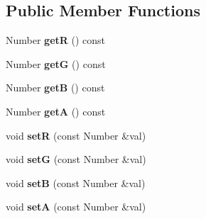 \subsection*{Public Member Functions}
\begin{DoxyCompactItemize}
\item 
\hypertarget{structsambag_1_1com_1_1_color_r_g_b_a_a9b798d27328dbe8bf719c66b1ae38d4b}{
Number {\bfseries getR} () const }
\label{structsambag_1_1com_1_1_color_r_g_b_a_a9b798d27328dbe8bf719c66b1ae38d4b}

\item 
\hypertarget{structsambag_1_1com_1_1_color_r_g_b_a_a1944ccc74667ade7eb8ff3863d9d2be4}{
Number {\bfseries getG} () const }
\label{structsambag_1_1com_1_1_color_r_g_b_a_a1944ccc74667ade7eb8ff3863d9d2be4}

\item 
\hypertarget{structsambag_1_1com_1_1_color_r_g_b_a_af1d0d208eb203a6bea572e62a62da0d8}{
Number {\bfseries getB} () const }
\label{structsambag_1_1com_1_1_color_r_g_b_a_af1d0d208eb203a6bea572e62a62da0d8}

\item 
\hypertarget{structsambag_1_1com_1_1_color_r_g_b_a_a19fb1e72e94790424350f59128c36202}{
Number {\bfseries getA} () const }
\label{structsambag_1_1com_1_1_color_r_g_b_a_a19fb1e72e94790424350f59128c36202}

\item 
\hypertarget{structsambag_1_1com_1_1_color_r_g_b_a_a897f7a0c478fe688aaaff8581ee568a0}{
void {\bfseries setR} (const Number \&val)}
\label{structsambag_1_1com_1_1_color_r_g_b_a_a897f7a0c478fe688aaaff8581ee568a0}

\item 
\hypertarget{structsambag_1_1com_1_1_color_r_g_b_a_ae9049c3c55b106dde4fa4edeaa87bdf0}{
void {\bfseries setG} (const Number \&val)}
\label{structsambag_1_1com_1_1_color_r_g_b_a_ae9049c3c55b106dde4fa4edeaa87bdf0}

\item 
\hypertarget{structsambag_1_1com_1_1_color_r_g_b_a_aec660bcad4e1d45e8c2b85f669b37689}{
void {\bfseries setB} (const Number \&val)}
\label{structsambag_1_1com_1_1_color_r_g_b_a_aec660bcad4e1d45e8c2b85f669b37689}

\item 
\hypertarget{structsambag_1_1com_1_1_color_r_g_b_a_aefe3fa39d556f33afb9f25ccec3cefbe}{
void {\bfseries setA} (const Number \&val)}
\label{structsambag_1_1com_1_1_color_r_g_b_a_aefe3fa39d556f33afb9f25ccec3cefbe}


\end{DoxyCompactItemize}
